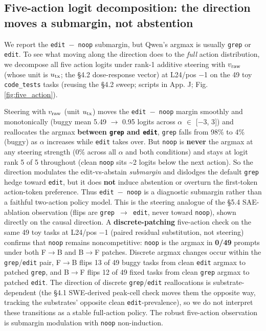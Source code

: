 \documentclass[
  11pt,
  a4paper]{article}
\begin{document}
\subsection{Five-action logit decomposition: the direction moves a
submargin, not
abstention}\label{five-action-logit-decomposition-the-direction-moves-a-submargin-not-abstention}

We report the \texttt{edit\ \ensuremath{-}\ noop} submargin, but Qwen's argmax is
usually \texttt{grep} or \texttt{edit}. To see what moving along the
direction does to the \emph{full} action distribution, we decompose all
five action logits under rank-1 additive steering with \(v_{\rm raw}\)
(whose unit is \(u_{\rm tx}\); the \S{}4.2 dose-response vector) at L24/pos
\ensuremath{-}1 on the 49 toy \texttt{code\_tests} tasks (reusing the \S{}4.2 sweep;
scripts in App. J; Fig. \ref{fig:five_action}).

Steering with \(v_{\rm raw}\) (unit \(u_{\rm tx}\)) moves the
\texttt{edit\ \ensuremath{-}\ noop} margin smoothly and monotonically (buggy mean
5.49 \ensuremath{\rightarrow} 0.95 logits across \ensuremath{\alpha} \ensuremath{\in} {[}\ensuremath{-}3, 3{]}) and reallocates the argmax
\textbf{between \texttt{grep} and \texttt{edit}}, \texttt{grep} falls
from 98\% to 4\% (buggy) as \ensuremath{\alpha} increases while \texttt{edit} takes over.
But \texttt{noop} is \textbf{never} the argmax at any steering strength
(0\% across all \ensuremath{\alpha} and both conditions) and stays at logit rank 5 of 5
throughout (clean \texttt{noop} sits \textasciitilde2 logits below the
next action). So the direction modulates the edit-vs-abstain
\emph{submargin} and dislodges the default \texttt{grep} hedge toward
\texttt{edit}, but it does \textbf{not} induce abstention or overturn
the first-token action-token preference. Thus \texttt{edit\ \ensuremath{-}\ noop} is
a diagnostic submargin rather than a faithful two-action policy model.
This is the steering analogue of the \S{}5.4 SAE-ablation observation
(flips are \texttt{grep\ \ensuremath{\rightarrow}\ edit}, never toward \texttt{noop}), shown
directly on the causal direction. A \textbf{discrete-patching}
five-action check on the same 49 toy tasks at L24/pos \ensuremath{-}1 (paired
residual substitution, not steering) confirms that \texttt{noop} remains
noncompetitive: \texttt{noop} is the argmax in \textbf{0/49} prompts
under both F\ensuremath{\rightarrow}B and B\ensuremath{\rightarrow}F patches. Discrete argmax changes occur within the
\texttt{grep}/\texttt{edit} pair, F\ensuremath{\rightarrow}B flips 13 of 49 buggy tasks from
clean \texttt{edit} argmax to patched \texttt{grep}, and B\ensuremath{\rightarrow}F flips 12 of
49 fixed tasks from clean \texttt{grep} argmax to patched \texttt{edit}.
The direction of discrete \texttt{grep}/\texttt{edit} reallocations is
substrate-dependent (the \S{}4.1 SWE-derived peak-cell check moves them the
opposite way, tracking the substrates' opposite clean
\texttt{edit}-prevalence), so we do not interpret these transitions as a
stable full-action policy. The robust five-action observation is
submargin modulation with \texttt{noop} non-induction.
\end{document}
